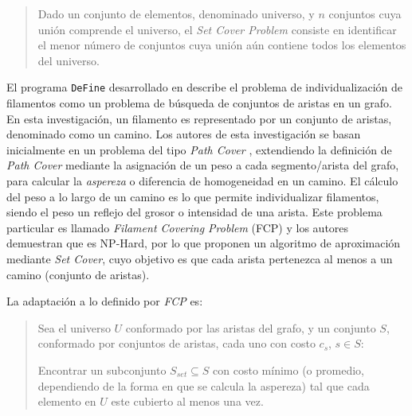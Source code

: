 \begin{quote}
Dado un conjunto de elementos, denominado universo, y $n$ conjuntos cuya unión comprende el universo, el {\it Set Cover Problem} consiste en identificar el menor n\'umero de conjuntos cuya unión a\'un contiene todos los elementos del universo.
\end{quote}


\medskip

El programa \texttt{DeFine} desarrollado en \cite{breuer2015define} describe el problema de individualizaci\'on de filamentos como un problema de b\'usqueda de conjuntos de aristas en un grafo. En esta investigaci\'on, un filamento es representado por un conjunto de aristas, denominado como un camino. Los autores de esta investigaci\'on se basan inicialmente en un problema del tipo {\it Path Cover} \cite{ntafos1979path}, extendiendo la definici\'on de {\it Path Cover} mediante la asignaci\'on de un peso a cada segmento/arista del grafo, para calcular la {\it aspereza} o diferencia de homogeneidad en un camino. El c\'alculo del peso a lo largo de un camino es lo que permite individualizar filamentos, siendo el peso un reflejo del grosor o intensidad de una arista.
Este problema particular es llamado {\it Filament Covering Problem} (FCP) y los autores demuestran que es NP-Hard, por lo que proponen un algoritmo de aproximaci\'on mediante {\it Set Cover}, cuyo objetivo es que cada arista pertenezca al menos a un camino (conjunto de aristas).

La adaptaci\'on a lo definido por {\it FCP} es: 
\begin{quote}
Sea el universo $U$ conformado por las aristas del grafo, y un conjunto $S$, conformado por conjuntos de aristas, cada uno con costo $c_s$, $s \in S$:

Encontrar un subconjunto $S_{set} \subseteq S$ con costo m\'inimo (o promedio, dependiendo de la forma en que se calcula la aspereza) tal que cada elemento en $U$ este cubierto al menos una vez.
\end{quote}

